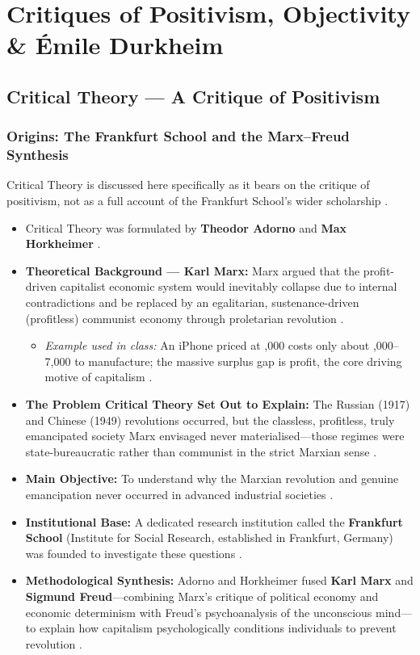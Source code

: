 
\chapter{Critiques of Positivism, Objectivity \& Émile Durkheim}

\section{Critical Theory --- A Critique of Positivism}

\subsection{Origins: The Frankfurt School and the Marx--Freud Synthesis}
Critical Theory is discussed here specifically as it bears on the critique of positivism, not as a full account of the Frankfurt School's wider scholarship .
\begin{itemize}
    \item Critical Theory was formulated by \textbf{Theodor Adorno} and \textbf{Max Horkheimer} .
    \item \textbf{Theoretical Background --- Karl Marx:} Marx argued that the profit-driven capitalist economic system would inevitably collapse due to internal contradictions and be replaced by an egalitarian, sustenance-driven (profitless) communist economy through proletarian revolution .
    \begin{itemize}
        \item \textit{Example used in class:} An iPhone priced at ,000 costs only about ,000--7,000 to manufacture; the massive surplus gap is profit, the core driving motive of capitalism .
    \end{itemize}
    \item \textbf{The Problem Critical Theory Set Out to Explain:} The Russian (1917) and Chinese (1949) revolutions occurred, but the classless, profitless, truly emancipated society Marx envisaged never materialised---those regimes were state-bureaucratic rather than communist in the strict Marxian sense .
    \item \textbf{Main Objective:} To understand why the Marxian revolution and genuine emancipation never occurred in advanced industrial societies .
    \item \textbf{Institutional Base:} A dedicated research institution called the \textbf{Frankfurt School} (Institute for Social Research, established in Frankfurt, Germany) was founded to investigate these questions .
    \item \textbf{Methodological Synthesis:} Adorno and Horkheimer fused \textbf{Karl Marx} and \textbf{Sigmund Freud}---combining Marx's critique of political economy and economic determinism with Freud's psychoanalysis of the unconscious mind---to explain how capitalism psychologically conditions individuals to prevent revolution .
\end{itemize}

